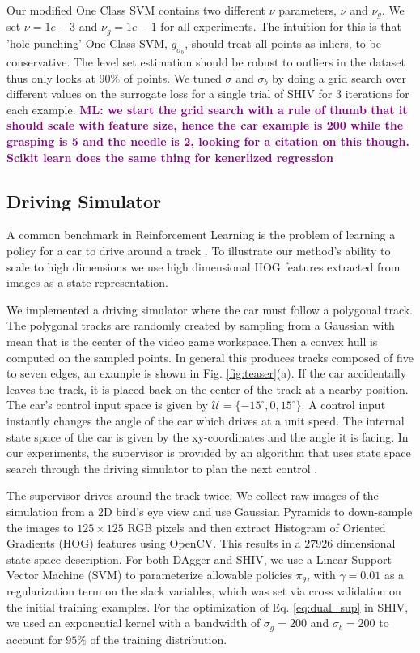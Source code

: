 \documentclass[10pt, conference]{ieeeconf}      %
\newcommand{\acro}{SHIV}
\newcommand{\mlnote}[1]{\ifthenelse{\boolean{include-notes}}%
 {\textcolor{purple}{\textbf{ML: #1}}}{}}
\begin{document}
Our modified One Class SVM contains two different $\nu$ parameters, $\nu$ and $\nu_g$. We set $\nu = 1e-3$ and $\nu_g = 1e-1$ for all experiments. The intuition for this is that 'hole-punching' One Class SVM, $g_{\sigma_b}$, should treat all points as inliers, to be conservative. The level set estimation should be robust to outliers in the dataset thus only looks at $90\%$ of points. We tuned $\sigma$ and $\sigma_b$ by doing a grid search over different values on the surrogate loss for a single trial of SHIV for 3 iterations for each example. \mlnote{we start the grid search with a rule of thumb that it should scale with feature size, hence the car example is 200 while the grasping is 5 and the needle is 2, looking for a citation on this though. Scikit learn does the same thing for kenerlized regression}

\subsection{Driving Simulator} \label{sec:car}
A common benchmark in Reinforcement Learning is the problem of learning a policy for a car to drive around a track
\cite{argall2009survey}. To illustrate our method's ability to scale to high dimensions we use high dimensional HOG features extracted from images
as a state representation. 

We implemented a driving simulator where the car must follow a polygonal track. The polygonal tracks are randomly created by sampling from a Gaussian with mean that is the center of the video game workspace.Then a convex hull is computed on the sampled points. In general this produces tracks composed of five to seven edges, an example is shown in Fig. \ref{fig:teaser}(a). If the car accidentally leaves the track, it is placed
back on the center of the track at a nearby position. The car's control input space is given by  $\mathcal{U} = \lbrace
-15^\circ, 0, 15^\circ \rbrace$. A control input instantly changes the angle of the car which drives at a unit speed. 
The internal state space of the car is given by the
xy-coordinates and the angle it is facing. In our experiments, the supervisor is provided by an algorithm that uses
state space search through the driving simulator to plan the next control .

The supervisor drives around the track twice. We collect raw images of the simulation from a 2D bird's eye view
and use Gaussian Pyramids to down-sample the images to $125 \times 125$ RGB pixels and then extract Histogram of
Oriented Gradients (HOG) features using OpenCV. This results in a $27926$ dimensional state space description.
For both DAgger and \acro, we use a Linear Support Vector Machine (SVM) to parameterize allowable
policies $\pi_{\theta}$, with $\gamma=0.01$ as a regularization term on the slack variables, which was set via cross
validation on the initial training examples. For the optimization of Eq. \ref{eq:dual_sup} in \acro, we used an
exponential kernel with a bandwidth of $\sigma_g = 200$ and $\sigma_b = 200$ to account for $95\%$ of the training distribution. 
\end{document}
